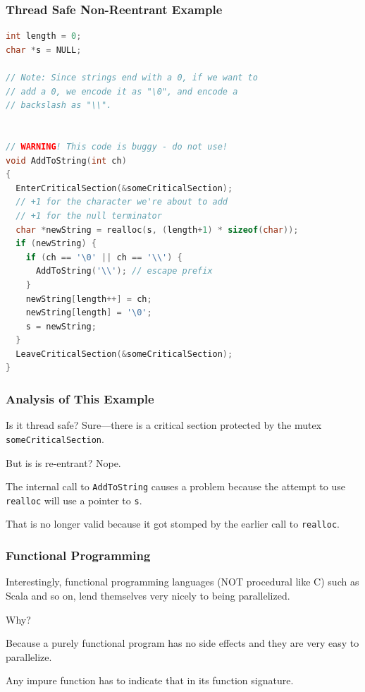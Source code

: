 \begin{frame}[fragile]
\frametitle{Thread Safe Non-Reentrant Example}
{\scriptsize
\begin{lstlisting}[language=C]
int length = 0;
char *s = NULL;

// Note: Since strings end with a 0, if we want to
// add a 0, we encode it as "\0", and encode a
// backslash as "\\".


// WARNING! This code is buggy - do not use!
void AddToString(int ch)
{
  EnterCriticalSection(&someCriticalSection);
  // +1 for the character we're about to add
  // +1 for the null terminator
  char *newString = realloc(s, (length+1) * sizeof(char));
  if (newString) {
    if (ch == '\0' || ch == '\\') {
      AddToString('\\'); // escape prefix
    }
    newString[length++] = ch;
    newString[length] = '\0';
    s = newString;
  }
  LeaveCriticalSection(&someCriticalSection);
}
\end{lstlisting}
}


\end{frame}



\begin{frame}
\frametitle{Analysis of This Example}

Is it thread safe? Sure---there is a critical section protected by the mutex \texttt{someCriticalSection}. 

But is is re-entrant? Nope. 

The internal call to \texttt{AddToString} causes a problem because the attempt to use \texttt{realloc} will use a pointer to \texttt{s}.

That is no longer valid because it got stomped by the earlier call to \texttt{realloc}.


\end{frame}



\begin{frame}
\frametitle{Functional Programming}

Interestingly, functional programming languages (NOT procedural like C) such as Scala and so on, lend themselves very nicely to being parallelized. 

Why? 

Because a purely functional program has no side effects and they are very easy to parallelize.

Any impure function has to indicate that in its function signature.

\end{frame}



